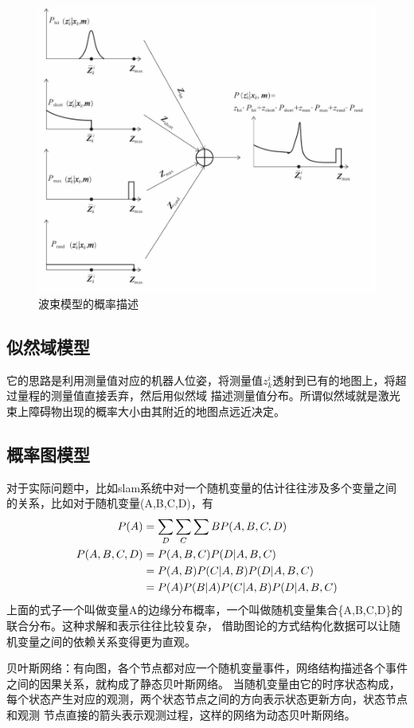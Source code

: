 \documentclass[10pt]{article}
\begin{document}
\begin{figure}[!htb]
    \includegraphics[width=\hsize]{images/波束模型的概率描述.png}
    \caption{波束模型的概率描述}
\end{figure}
\subsection{似然域模型}
它的思路是利用测量值对应的机器人位姿，将测量值$z_{k}^{i}$透射到已有的地图上，将超过量程的测量值直接丢弃，然后用似然域
描述测量值分布。所谓似然域就是激光束上障碍物出现的概率大小由其附近的地图点远近决定。
\subsection{概率图模型}
对于实际问题中，比如slam系统中对一个随机变量的估计往往涉及多个变量之间的关系，比如对于随机变量(A,B,C,D)，有
\begin{align} 
    P(A)&=\sum_{D}\sum_{C}\sum{B}P(A,B,C,D) \\
    P(A,B,C,D)&=P(A,B,C)P(D|A,B,C)  \notag\\
              &=P(A,B)P(C|A,B)P(D|A,B,C) \\
              &=P(A)P(B|A)P(C|A,B)P(D|A,B,C) \notag
\end{align}
上面的式子一个叫做变量A的边缘分布概率，一个叫做随机变量集合\{A,B,C,D\}的联合分布。这种求解和表示往往比较复杂，
借助图论的方式结构化数据可以让随机变量之间的依赖关系变得更为直观。

贝叶斯网络：有向图，各个节点都对应一个随机变量事件，网络结构描述各个事件之间的因果关系，就构成了静态贝叶斯网络。
当随机变量由它的时序状态构成，每个状态产生对应的观测，两个状态节点之间的方向表示状态更新方向，状态节点和观测
节点直接的箭头表示观测过程，这样的网络为动态贝叶斯网络。
\end{document}

